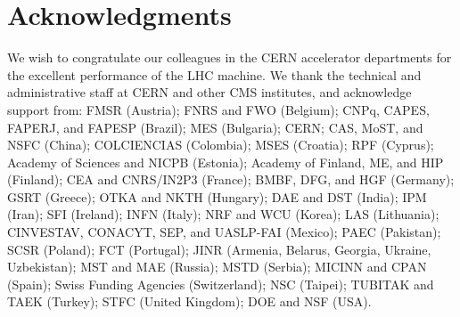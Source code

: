 \section*{Acknowledgments}


We wish to congratulate our colleagues in the CERN accelerator departments for the excellent performance of the LHC machine. We thank the technical and administrative staff at CERN and other CMS institutes, and acknowledge support from: FMSR (Austria); FNRS and FWO (Belgium); CNPq, CAPES, FAPERJ, and FAPESP (Brazil); MES (Bulgaria); CERN; CAS, MoST, and NSFC (China); COLCIENCIAS (Colombia); MSES (Croatia); RPF (Cyprus); Academy of Sciences and NICPB (Estonia); Academy of Finland, ME, and HIP (Finland); CEA and CNRS/IN2P3 (France); BMBF, DFG, and HGF (Germany); GSRT (Greece); OTKA and NKTH (Hungary); DAE and DST (India); IPM (Iran); SFI (Ireland); INFN (Italy); NRF and WCU (Korea); LAS (Lithuania); CINVESTAV, CONACYT, SEP, and UASLP-FAI (Mexico); PAEC (Pakistan); SCSR (Poland); FCT (Portugal); JINR (Armenia, Belarus, Georgia, Ukraine, Uzbekistan); MST and MAE (Russia); MSTD (Serbia); MICINN and CPAN (Spain); Swiss Funding Agencies (Switzerland); NSC (Taipei); TUBITAK and TAEK (Turkey); STFC (United Kingdom); DOE and NSF (USA).